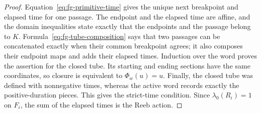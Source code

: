 \begin{proof}
Equation~\eqref{eq:fg-primitive-time} gives the unique next breakpoint and
elapsed time for one passage.  The endpoint and the elapsed time are affine,
and the domain inequalities state exactly that the endpoints and the passage
belong to \(K\).  Formula~\eqref{eq:fg-tube-composition} says that two passages
can be concatenated exactly when their common breakpoint agrees; it also
composes their endpoint maps and adds their elapsed times.  Induction over the
word proves the assertion for the closed tube.  Its starting and ending
sections have the same coordinates, so closure is equivalent to
\(\Phi_w(u)=u\).  Finally, the closed tube was defined with nonnegative times,
whereas the active word records exactly the positive-duration pieces.  This
gives the strict-time condition.  Since
\(\lambda_0(R_i)=1\) on \(F_i\), the sum of the elapsed times is the Reeb
action.
\end{proof}

